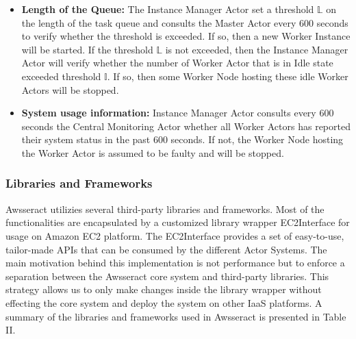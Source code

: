 \documentclass[conference]{IEEEtran}
\begin{document}
\begin{itemize}
  \item \textbf{Length of the Queue:} The Instance Manager Actor set a threshold $\mathbb{L}$ on the length of the task queue and consults the Master Actor every 600 seconds to verify whether the threshold is exceeded. If so, then a new Worker Instance will be started. If the threshold $\mathbb{L}$ is not exceeded, then the Instance Manager Actor will verify whether the number of Worker Actor that is in Idle state exceeded threshold $\mathbb{I}$. If so, then some Worker Node hosting these idle Worker Actors will be stopped.
  \item \textbf{System usage information:} Instance Manager Actor consults every 600 seconds the Central Monitoring Actor whether all Worker Actors has reported their system status in the past 600 seconds. If not, the Worker Node hosting the Worker Actor is assumed to be faulty and will be stopped. \\
\end{itemize} 


\subsubsection{Libraries and Frameworks}\label{sec:sysdesign_lib}
 Awsseract utilizies several third-party libraries and frameworks. Most of the functionalities are encapsulated by a customized library wrapper EC2Interface for usage on Amazon EC2 platform. The EC2Interface provides a set of easy-to-use, tailor-made APIs that can be consumed by the different Actor Systems. The main motivation behind this implementation is not performance but to enforce a separation between the Awsseract core system and third-party libraries. This strategy allows us to only make changes inside the library wrapper without effecting the core system and deploy the system on other IaaS platforms. A summary of the libraries and frameworks used in Awsseract is presented in Table II. \\
\end{document}
